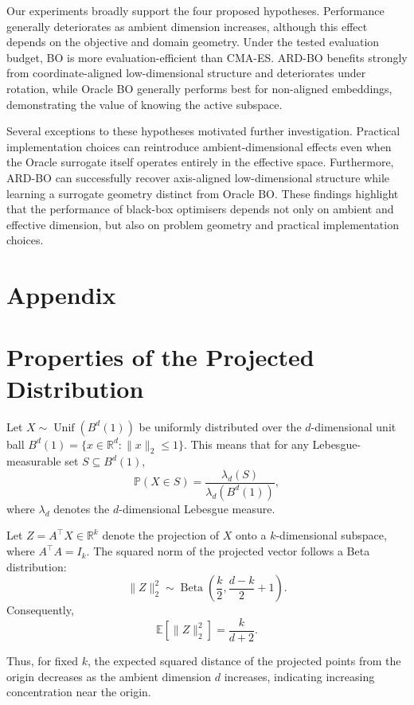 \documentclass[10pt]{article}
\begin{document}
Our experiments broadly support the four proposed hypotheses. Performance generally deteriorates as ambient dimension increases, although this effect depends on the objective and domain geometry. Under the tested evaluation budget, BO is more evaluation-efficient than CMA-ES. ARD-BO benefits strongly from coordinate-aligned low-dimensional structure and deteriorates under rotation, while Oracle BO generally performs best for non-aligned embeddings, demonstrating the value of knowing the active subspace.

Several exceptions to these hypotheses motivated further investigation. Practical implementation choices can reintroduce ambient-dimensional effects even when the Oracle surrogate itself operates entirely in the effective space. Furthermore, ARD-BO can successfully recover axis-aligned low-dimensional structure while learning a surrogate geometry distinct from Oracle BO. These findings highlight that the performance of black-box optimisers depends not only on ambient and effective dimension, but also on problem geometry and practical implementation choices.

 

\newpage
\appendix

\section*{Appendix}

\section{Properties of the Projected Distribution}
\label{app:projected-distribution}


Let $X\sim\operatorname{Unif}(B^d(1))$ be uniformly distributed
over the $d$-dimensional unit ball
$B^d(1)=\{x\in\mathbb R^d:\|x\|_2\leq1\}$.
This means that for any Lebesgue-measurable set
$S\subseteq B^d(1)$,
\[
\mathbb P(X\in S)
=\frac{\lambda_d(S)}{\lambda_d(B^d(1))},
\]
where $\lambda_d$ denotes the $d$-dimensional Lebesgue measure.

Let $Z=A^\top X\in\mathbb R^k$ denote the projection of $X$
onto a $k$-dimensional subspace, where $A^\top A=I_k$.
The squared norm of the projected vector follows a Beta distribution:
\[
\|Z\|_2^2\sim
\operatorname{Beta}\left(\frac{k}{2},\frac{d-k}{2}+1\right).
\]
Consequently,
\[
\mathbb E[\|Z\|_2^2]=\frac{k}{d+2}.
\]

Thus, for fixed $k$, the expected squared distance of the
projected points from the origin decreases as the ambient
dimension $d$ increases, indicating increasing concentration
near the origin.
\end{document}
